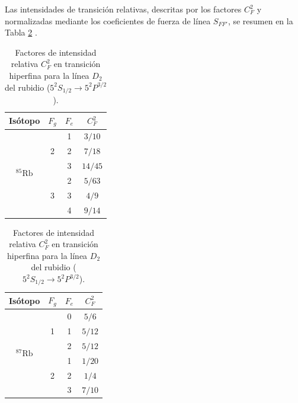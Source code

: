 Las intensidades de transición relativas, descritas por los factores $C_F^2$ y normalizadas mediante los coeficientes de fuerza de línea $S_{FF'}$, se resumen en la Tabla \ref{tab:rb_D2_cge_params} \cite{danieladamsteckrubidium85Dlinedata, danieladamsteckrubidium87Dlinedata}.

\begin{table}[htbp]
  \centering
  \caption{Factores de intensidad relativa $C_F^2$ en transición hiperfina para la línea $D_2$ del rubidio ($5^2S_{1/2} \to 5^2P^{3/2}$).}

    \begin{tabular}{cccc}
    \toprule
    \textbf{Isótopo} &
      \boldmath{}\textbf{$F_g$}\unboldmath{} &
      \boldmath{}\textbf{$F_e$}\unboldmath{} &
      \boldmath{}\textbf{$C_F^2$}\unboldmath{}
      \\
    \midrule
    \multirow{6}[12]{*}{\boldmath{}\textbf{$^{85}\text{Rb}$}\unboldmath{}} &
      \multirow{3}[6]{*}{2} &
      1 &
      $3/10$
      \\
\cmidrule{3-4}     &
       &
      2 &
      $7/18$
      \\
\cmidrule{3-4}     &
       &
      3 &
      $14/45$
      \\
\cmidrule{2-4}     &
      \multirow{3}[6]{*}{3} &
      2 &
      $5/63$
      \\
\cmidrule{3-4}     &
       &
      3 &
      $4/9$
      \\
\cmidrule{3-4}     &
       &
      4 &
      $9/14$
      \\
    \bottomrule
    \end{tabular}%
    \hspace{20pt}
    \begin{tabular}{cccc}
    \toprule
    \textbf{Isótopo} &
      \boldmath{}\textbf{$F_g$}\unboldmath{} &
      \boldmath{}\textbf{$F_e$}\unboldmath{} &
      \boldmath{}\textbf{$C_F^2$}\unboldmath{}
      \\
    \midrule
    \multirow{6}[12]{*}{\boldmath{}\textbf{$^{87}\text{Rb}$}\unboldmath{}} &
      \multirow{3}[6]{*}{1} &
      0 &
      $5/6$
      \\
\cmidrule{3-4}     &
       &
      1 &
      $5/12$
      \\
\cmidrule{3-4}     &
       &
      2 &
      $5/12$
      \\
\cmidrule{2-4}     &
      \multirow{3}[6]{*}{2} &
      1 &
      $1/20$
      \\
\cmidrule{3-4}     &
       &
      2 &
      $1/4$
      \\
\cmidrule{3-4}     &
       &
      3 &
      $7/10$
      \\
    \bottomrule
    \end{tabular}
  \label{tab:rb_D2_cge_params}%
\end{table}%

\nocite{*}


